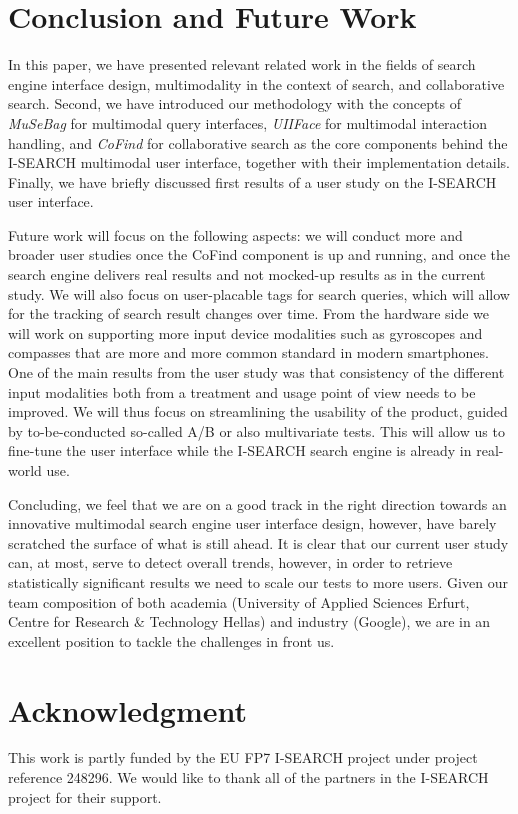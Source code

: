 \documentclass[runningheads,a4paper]{llncs} \usepackage[utf8]{inputenc}
\begin{document}
\section{Conclusion and Future Work}
In this paper, we have presented relevant related work in the fields of search engine interface design, multimodality in the context of search, and collaborative search. Second, we have introduced our methodology with the concepts of \emph{MuSeBag} for multimodal query interfaces, \emph{UIIFace} for multimodal interaction handling, and \emph{CoFind} for collaborative search as the core components behind the \mbox{I-SEARCH} multimodal user interface, together with their implementation details. Finally, we have briefly discussed first results of a user study on the \mbox{I-SEARCH} user interface.

Future work will focus on the following aspects: we will conduct more and broader user studies once the \mbox{CoFind} component is up and running, and once the search engine delivers real results and not mocked-up results as in the current study. We will also focus on user-placable tags for search queries, which will allow for the tracking of search result changes over time. From the hardware side we will work on supporting more input device modalities such as gyroscopes and compasses that are more and more common standard in modern smartphones. One of the main results from the user study was that consistency of the different input modalities both from a treatment and usage point of view needs to be improved. We will thus focus on streamlining the usability of the product, guided by to-be-conducted so-called A/B or also multivariate tests. This will allow us to fine-tune the user interface while the \mbox{I-SEARCH} search engine is already in real-world use.

Concluding, we feel that we are on a good track in the right direction towards an innovative multimodal search engine user interface design, however, have barely scratched the surface of what is still ahead. It is clear that our current user study can, at most, serve to detect overall trends, however, in order to retrieve statistically significant results we need to scale our tests to more users. Given our team composition of both academia (University of Applied Sciences Erfurt, Centre for Research \& Technology Hellas) and industry (Google), we are in an excellent position to tackle the challenges in front us.

\section{Acknowledgment}
This work is partly funded by the EU FP7 \mbox{I-SEARCH} project under project reference 248296. We would like to thank all of the partners in the \mbox{I-SEARCH} project for their support.



\end{document}

